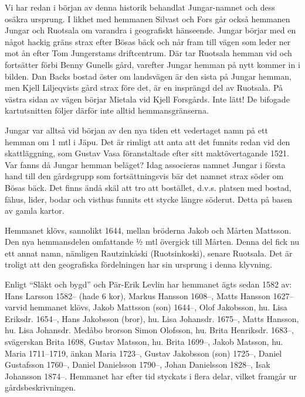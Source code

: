 

Vi har redan i början av denna historik behandlat Jungar-namnet och dess osäkra ursprung.
I likhet med hemmanen Silvast och Fors går också hemmanen Jungar och Ruotsala om varandra i geografiskt hänseende. Jungar börjar med en något hackig gräns strax efter  Bösas bäck och når fram till vägen som leder ner mot ån efter Tom Jungerstams driftcentrum. Där tar Ruotsala hemman vid och fortsätter förbi Benny Gunells gård, varefter Jungar hemman på nytt kommer in i bilden. Dan Backs bostad öster om landsvägen är den sista på Jungar hemman, men Kjell Liljeqvists gård strax före det, är en  insprängd del av Ruotsala. På västra sidan av vägen börjar Mietala vid Kjell Forsgårds. Inte lätt! De bifogade kartutsnitten följer därför inte alltid hemmansgränserna.

Jungar var alltså vid början av den nya tiden ett vedertaget namn på ett hemman om 1 mtl i Jäpu. Det är rimligt att anta att det funnits redan vid den skattläggning, som Gustav Vasa föranstaltade efter sitt maktövertagande 1521. Var fanns då Jungar hemman beläget? Idag associeras namnet Jungar i första hand till den gårdsgrupp som fortsättningsvis bär det namnet strax söder om Bösas bäck. Det finns ändå skäl att tro att bostället, d.v.s. platsen med bostad, fähus, lider, bodar och visthus funnits ett stycke längre söderut. Detta på basen av gamla kartor.

Hemmanet klövs, sannolikt 1644, mellan bröderna Jakob och Mårten Mattsson. Den nya hemmansdelen omfattande ½ mtl övergick till Mårten. Denna del fick nu ett annat namn, nämligen Rautzinkåski (Ruotsinkoski), senare Ruotsala. Det är troligt att den geografiska fördelningen har sin ursprung i denna klyvning.

Enligt ``Släkt och bygd'' och Pär-Erik Levlin har hemmanet ägts sedan 1582 av:
Hans Larsson  1582-- (hade 6 kor), Markus Hansson 1608--, Matts Hansson 1627-- varvid hemmanet klövs, Jakob Mattsson (son) 1644--, Olof Jakobsson, hu. Lisa Eriksdr. 1654--, Hans Jakobsson (bror), hu. Lisa Johansdr. 1675--, Matts Hansson, hu. Lisa Johansdr. Medåbo brorson Simon Olofsson, hu. Brita Henriksdr. 1683--, svägerskan Brita 1698, Gustav Matsson, hu. Brita 1699--, Jakob Matsson, hu. Maria 1711--1719, änkan Maria 1723--, Gustav Jakobsson (son) 1725--, Daniel Gustafsson 1760--, Daniel Danielsson 1790--, Johan Danielsson 1828--, Isak Johansson 1874--. Hemmanet har efter tid styckats i flera delar, vilket framgår ur gårdsbeskrivningen.

